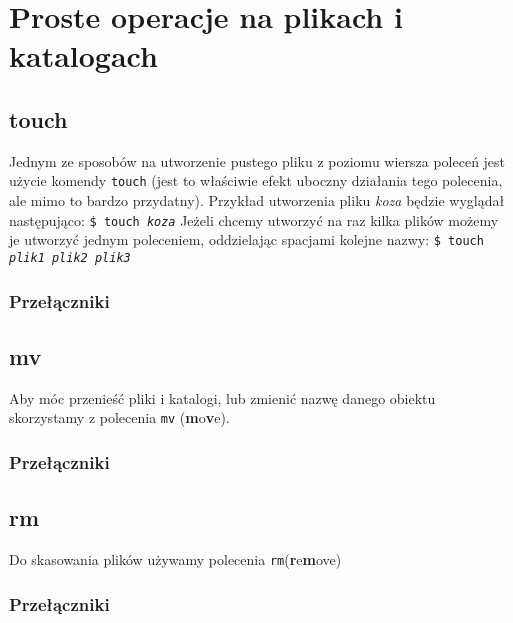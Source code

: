 \documentclass[10 pt, a4paper, draft]{article}
\begin{document}
\newpage
\section{Proste operacje na plikach i katalogach}
\subsection{touch}
Jednym ze sposobów na utworzenie pustego pliku z poziomu wiersza poleceń jest użycie komendy \texttt{touch} (jest to właściwie efekt uboczny działania tego polecenia, ale mimo to bardzo przydatny). Przykład utworzenia pliku \textit{koza} będzie wyglądał następująco:
\newline
\texttt{\$ touch \textit{koza}}
\newline
Jeżeli chcemy utworzyć na raz kilka plików możemy je utworzyć jednym poleceniem, oddzielając spacjami kolejne nazwy:
\newline
\texttt{\$ touch \textit{plik1 plik2 plik3}}
\subsubsection*{Przełączniki}

\subsection{mv}
Aby móc przenieść pliki i katalogi, lub zmienić nazwę danego obiektu skorzystamy z polecenia \texttt{mv} (\textbf{m}o\textbf{v}e).
\subsubsection*{Przełączniki}

\subsection{rm}
Do skasowania plików używamy polecenia \texttt{rm}(\textbf{r}e\textbf{m}ove)
\subsubsection*{Przełączniki}
\end{document}
